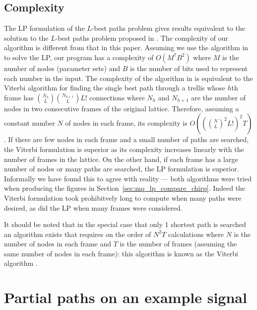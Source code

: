 \subsection{Complexity}

The LP formulation of the $L$-best paths problem gives results equivalent to the
solution to the $L$-best paths problem proposed in \cite{wolf1989finding}. The
complexity of our algorithm is different from that in this paper.  Assuming we
use the algorithm in \cite{karmarkar1984new} to solve the LP, our program has a
complexity of $O(M^{7}B^{2})$ where $M$ is the number of nodes (parameter sets)
and $B$ is the number of bits used to represent each number in the input. The
complexity of the algorithm in \cite{wolf1989finding} is equivalent to the
Viterbi algorithm for finding the single best path through a trellis whose $h$th
frame has $\binom{N_{h}}{L}\binom{N_{h+1}}{L}L!$ connections where $N_{h}$ and
$N_{h+1}$ are the number of nodes in two consecutive frames of the original
lattice. Therefore, assuming a constant number $N$ of nodes in each frame, its
complexity is $O((\binom{N}{L}^{2}L!)^{2}T)$. If there are few nodes in each
frame and a small number of paths are searched, the Viterbi formulation is
superior as its complexity increases linearly with the number of frames in the
lattice. On the other hand, if each frame has a large number of nodes or many
paths are searched, the LP formulation is superior.  Informally we have found
this to agree with reality --- both algorithms were tried when producing the
figures in Section~\ref{sec:mq_lp_compare_chirp}.  Indeed the Viterbi
formulation took prohibitvely long to compute when many paths were desired, as
did the LP when many frames were considered.

It should be noted that in the special case that only 1 shortest path is
searched an algorithm exists that requires on the order of $N^{2}T$ calculations
\cite{rabiner1989tutorial} where $N$ is the number of nodes in each frame and
$T$ is the number of frames (assuming the same number of nodes in each frame):
this algorithm is known as the Viterbi algorithm \cite{forney1973viterbi}.

\section{Partial paths on an example signal\label{sec:mq_lp_compare_chirp}}

